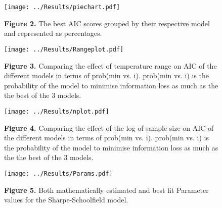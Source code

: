\documentclass[fontsize=11pt]{scrartcl}\usepackage[]{graphicx}\usepackage[]{color}
\begin{document}
  \begin{figure}[]
    \texttt{[image: ../Results/piechart.pdf]}
    \begin{center}
    \textbf{Figure 2.} The best AIC scores grouped by their respective model and represented as percentages. 
    \end{center}
  \end{figure}

  \begin{figure}[]
    \texttt{[image: ../Results/Rangeplot.pdf]}
    \begin{center}
    \textbf{Figure 3.} Comparing the effect of temperature range on AIC of the different models in terms of prob(min vs. i). 
    prob(min vs. i) is the probability of the model to minimise information loss as much as the the best of the 3 models.
    \end{center}
  \end{figure}

  \begin{figure}[]
    \texttt{[image: ../Results/nplot.pdf]}
    \begin{center}
    \textbf{Figure 4.} Comparing the effect of the log of sample size on AIC of the different models in terms of prob(min vs. i). 
    prob(min vs. i) is the probability of the model to minimise information loss as much as the the best of the 3 models.
    \end{center}
  \end{figure}

  \begin{figure}[]
    \texttt{[image: ../Results/Params.pdf]}
    \begin{center}
    \textbf{Figure 5.} Both mathematically estimated and best fit Parameter values for the Sharpe-Schoolfield model.
    \end{center}
  \end{figure}
\end{document}
